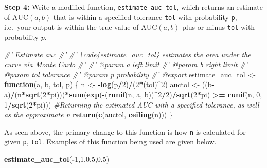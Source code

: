 \documentclass[
]{article}
\newenvironment{Shaded}{\begin{snugshade}}{\end{snugshade}}
\newcommand{\CommentTok}[1]{\textcolor[rgb]{0.56,0.35,0.01}{\textit{#1}}}
\newcommand{\ControlFlowTok}[1]{\textcolor[rgb]{0.13,0.29,0.53}{\textbf{#1}}}
\newcommand{\DecValTok}[1]{\textcolor[rgb]{0.00,0.00,0.81}{#1}}
\newcommand{\FloatTok}[1]{\textcolor[rgb]{0.00,0.00,0.81}{#1}}
\newcommand{\KeywordTok}[1]{\textcolor[rgb]{0.13,0.29,0.53}{\textbf{#1}}}
\newcommand{\NormalTok}[1]{#1}
\newcommand{\OperatorTok}[1]{\textcolor[rgb]{0.81,0.36,0.00}{\textbf{#1}}}
\newcommand{\StringTok}[1]{\textcolor[rgb]{0.31,0.60,0.02}{#1}}
\begin{document}
\textbf{Step 4:} Write a modified function, \texttt{estimate\_auc\_tol},
which returns an estimate of \(\text{AUC}(a,b)\) that is within a
specified tolerance \texttt{tol} with probability \texttt{p}, i.e.~your
output is within the true value of \(\text{AUC}(a,b)\) plus or minus
\texttt{tol} with probability \(p\).

\begin{Shaded}
\begin{Highlighting}[]
\CommentTok{#' Estimate auc}
\CommentTok{#' }
\CommentTok{#' \textbackslash{}code\{estimate_auc_tol\} estimates the area under the curve via Monte Carlo}
\CommentTok{#' }
\CommentTok{#' @param a left limit}
\CommentTok{#' @param b right limit}
\CommentTok{#' @param tol tolerance}
\CommentTok{#' @param p probability}
\CommentTok{#' @export}
\NormalTok{estimate_auc_tol <-}\StringTok{ }\ControlFlowTok{function}\NormalTok{(a, b, tol, p) \{}
\NormalTok{  n <-}\StringTok{ }\OperatorTok{-}\KeywordTok{log}\NormalTok{(p}\OperatorTok{/}\DecValTok{2}\NormalTok{)}\OperatorTok{/}\NormalTok{(}\DecValTok{2}\OperatorTok{*}\NormalTok{(tol)}\OperatorTok{^}\DecValTok{2}\NormalTok{)}
\NormalTok{  auctol <-}\StringTok{ }\NormalTok{((b}\OperatorTok{-}\NormalTok{a)}\OperatorTok{/}\NormalTok{(n}\OperatorTok{*}\KeywordTok{sqrt}\NormalTok{(}\DecValTok{2}\OperatorTok{*}\NormalTok{pi)))}\OperatorTok{*}\KeywordTok{sum}\NormalTok{(}\KeywordTok{exp}\NormalTok{(}\OperatorTok{-}\NormalTok{(}\KeywordTok{runif}\NormalTok{(n, a, b))}\OperatorTok{^}\DecValTok{2}\OperatorTok{/}\DecValTok{2}\NormalTok{)}\OperatorTok{/}\KeywordTok{sqrt}\NormalTok{(}\DecValTok{2}\OperatorTok{*}\NormalTok{pi) }
                           \OperatorTok{>=}\StringTok{ }\KeywordTok{runif}\NormalTok{(n, }\DecValTok{0}\NormalTok{, }\DecValTok{1}\OperatorTok{/}\KeywordTok{sqrt}\NormalTok{(}\DecValTok{2}\OperatorTok{*}\NormalTok{pi)))}
  \CommentTok{#Returning the estimated AUC with a specified tolerance, as well as the approximate n}
  \KeywordTok{return}\NormalTok{(}\KeywordTok{c}\NormalTok{(auctol, }\KeywordTok{ceiling}\NormalTok{(n)))}
\NormalTok{\}}
\end{Highlighting}
\end{Shaded}

As seen above, the primary change to this function is how \texttt{n} is
calculated for given \texttt{p}, \texttt{tol}. Examples of this function
being used are given below.

\begin{Shaded}
\begin{Highlighting}[]
\KeywordTok{estimate_auc_tol}\NormalTok{(}\OperatorTok{-}\DecValTok{1}\NormalTok{,}\DecValTok{1}\NormalTok{,}\FloatTok{0.5}\NormalTok{,}\FloatTok{0.5}\NormalTok{)}
\end{Highlighting}
\end{Shaded}
\end{document}
